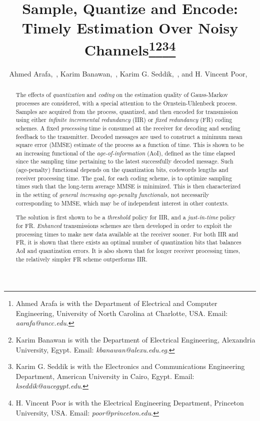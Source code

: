 \documentclass[12pt,journal,onecolumn]{IEEEtran}
\begin{document}
\title{Sample, Quantize and Encode:\\Timely Estimation Over Noisy Channels\thanks{Ahmed Arafa is with the Department of Electrical and Computer Engineering, University of North Carolina at Charlotte, USA. Email: {\it aarafa@uncc.edu}.}\thanks{Karim Banawan is with the Department of Electrical Engineering, Alexandria University, Egypt. Email: {\it kbanawan@alexu.edu.eg}.}\thanks{Karim G. Seddik is with the Electronics and Communications Engineering Department, American University in Cairo, Egypt. Email: {\it kseddik@aucegypt.edu}.}\thanks{H. Vincent Poor is with the Electrical Engineering Department, Princeton University, USA. Email: {\it poor@princeton.edu}.}}

\author{Ahmed Arafa,~, Karim Banawan,~, Karim G. Seddik,~, and H. Vincent Poor,~}



\maketitle



\vspace{-.5in}
\begin{abstract}
The effects of {\it quantization} and {\it coding} on the estimation quality of Gauss-Markov processes are considered, with a special attention to the Ornstein-Uhlenbeck process. Samples are acquired from the process, quantized, and then encoded for transmission using either {\it infinite incremental redundancy} (IIR) or {\it fixed redundancy} (FR) coding schemes. A fixed {\it processing} time is consumed at the receiver for decoding and sending feedback to the transmitter. Decoded messages are used to construct a minimum mean square error (MMSE) estimate of the process as a function of time. This is shown to be an increasing functional of the {\it age-of-information} (AoI), defined as the time elapsed since the sampling time pertaining to the latest successfully decoded message. Such (age-penalty) functional depends on the quantization bits, codewords lengths and receiver processing time. The goal, for each coding scheme, is to optimize sampling times such that the long-term average MMSE is minimized. This is then characterized in the setting of {\it general increasing age-penalty functionals,} not necessarily corresponding to MMSE, which may be of independent interest in other contexts. 

The solution is first shown to be a {\it threshold} policy for IIR, and a {\it just-in-time} policy for FR. {\it Enhanced} transmissions schemes are then developed in order to exploit the processing times to make new data available at the receiver sooner. For both IIR and FR, it is shown that there exists an optimal number of quantization bits that balances AoI and quantization errors. It is also shown that for longer receiver processing times, the relatively simpler FR scheme outperforms IIR.
\end{abstract}
\end{document}
